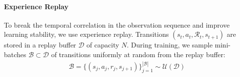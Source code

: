



\paragraph{Experience Replay}

To break the temporal correlation in the observation sequence and improve learning stability, we use experience replay. Transitions $(s_t, a_t, \mathcal R_t, s_{t+1})$ are stored in a replay buffer $\mathcal{D}$ of capacity $N$. During training, we sample mini-batches $\mathcal{B} \subset \mathcal{D}$ of transitions uniformly at random from the replay buffer:
\begin{align}
\mathcal{B} = \{(s_j, a_j, r_j, s_{j+1})\}
_{j=1}^{|\mathcal{B}|}
\sim \mathcal{U}(\mathcal{D})
\end{align}

